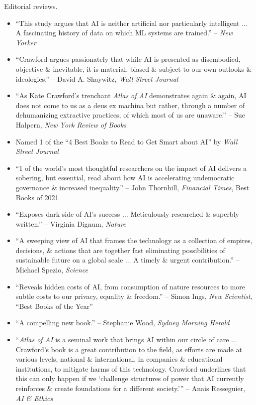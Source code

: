 \documentclass{article}
\begin{document}
\begin{enumerate}
    {\sf Editorial reviews.}
    \begin{itemize}
        \item ``This study argues that AI is neither artificial nor particularly intelligent $\ldots$ A fascinating history of data on which ML systems are trained.'' -- {\it New Yorker}
        \item ``{\sc Crawford} argues passionately that while AI is presented as disembodied, objective \& inevitable, it is material, biased \& subject to our own outlooks \& ideologies.'' -- {\sc David A. Shaywitz}, {\it Wall Street Journal}
        \item ``As {\sc Kate Crawford}'s trenchant {\it Atlas of AI} demonstrates again \& again, AI does not come to us as a deus ex machina but rather, through a number of dehumanizing extractive practices, of which most of us are unaware.'' -- {\sc Sue Halpern}, {\it New York Review of Books}
        \item Named 1 of the ``4 Best Books to Read to Get Smart about AI'' by {\it Wall Street Journal}
        \item ``1 of the world's most thoughtful researchers on the impact of AI delivers a sobering, but essential, read about how AI is accelerating undemocratic governance \& increased inequality.'' -- {\sc John Thornhill}, {\it Financial Times}, Best Books of 2021
        \item ``Exposes dark side of AI's success $\ldots$ Meticulously researched \& superbly written.'' -- {\sc Virginia Dignum}, {\it Nature}
        \item ``A sweeping view of AI that frames the technology as a collection of empires, decisions, \& actions that are together fast eliminating possibilities of sustainable future on a global scale $\ldots$ A timely \& urgent contribution.'' -- {\sc Michael Spezio}, {\it Science}
        \item ``Reveals hidden costs of AI, from consumption of nature resources to more subtle costs to our privacy, equality \& freedom.'' -- {\sc Simon Ings}, {\it New Scientist}, ``Best Books of the Year''
        \item ``A compelling new book.'' -- {\sc Stephanie Wood}, {\it Sydney Morning Herald}
        \item ``{\it Atlas of AI} is a seminal work that brings AI within our circle of care $\ldots$ {\sc Crawford}'s book is a great contribution to the field, as efforts are made at various levels, national \& international, in companies \& educational institutions, to mitigate harms of this technology. {\sc Crawford} underlines that this can only happen if we `challenge structures of power that AI currently reinforces \& create foundations for a different society.''' -- {\sc Anais Resseguier}, {\it AI \& Ethics}

\end{itemize}
\end{enumerate}
\end{document}
